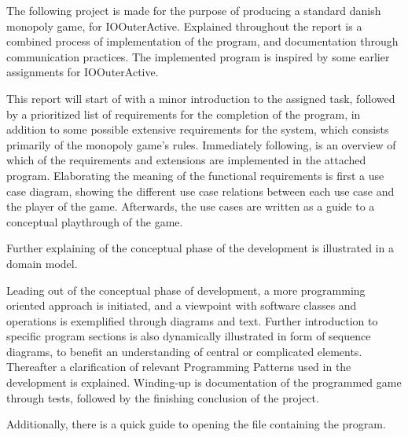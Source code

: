\documentclass[class=article, crop=false]{standalone}
\begin{document}
    The following project is made for the purpose of producing a standard danish monopoly game, for IOOuterActive. Explained throughout the report is a combined process of implementation of the program, and documentation through communication practices. The implemented program is inspired by some earlier assignments for IOOuterActive. \par

    This report will start of with a minor introduction to the assigned task, followed by a prioritized list of requirements for the completion of the program, in addition to some possible extensive requirements for the system, which consists primarily of the monopoly game’s rules. Immediately following, is an overview of which of the requirements and extensions are implemented in the attached program. Elaborating the meaning of the functional requirements is first a use case diagram, showing the different use case relations between each use case and the player of the game. Afterwards, the use cases are written as a guide to a conceptual playthrough of the game. \par
    Further explaining of the conceptual phase of the development is illustrated in a domain model. \par
    Leading out of the conceptual phase of development, a more programming oriented approach is initiated, and a viewpoint with software classes and operations is exemplified through diagrams and text. Further introduction to specific program sections is also dynamically illustrated in form of sequence diagrams, to benefit an understanding of central or complicated elements. Thereafter a clarification of relevant Programming Patterns used in the development is explained. Winding-up is documentation of the programmed game through tests, followed by the finishing conclusion of the project. \par

    Additionally, there is a quick guide to opening the file containing the program.
\end{document}
